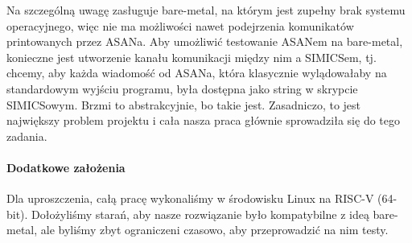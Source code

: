 \documentclass[../main.tex]{subfiles}
\begin{document}
Na szczególną uwagę zasługuje bare-metal, na którym jest zupełny brak systemu
operacyjnego, więc nie ma możliwości nawet podejrzenia komunikatów printowanych
przez ASANa. Aby umożliwić testowanie ASANem na bare-metal, konieczne jest
utworzenie kanału komunikacji między nim a SIMICSem, tj. chcemy, aby każda
wiadomość od ASANa, która klasycznie wylądowałaby na standardowym wyjściu
programu, była dostępna jako string w skrypcie SIMICSowym. Brzmi to
abstrakcyjnie, bo takie jest. Zasadniczo, to jest największy problem projektu i
cała nasza praca głównie sprowadziła się do tego zadania.

\paragraph{Dodatkowe założenia}
Dla uproszczenia, całą pracę wykonaliśmy w środowisku Linux na RISC-V (64-bit).
Dołożyliśmy starań, aby nasze rozwiązanie było kompatybilne z ideą bare-metal,
ale byliśmy zbyt ograniczeni czasowo, aby przeprowadzić na nim testy.
\end{document}
